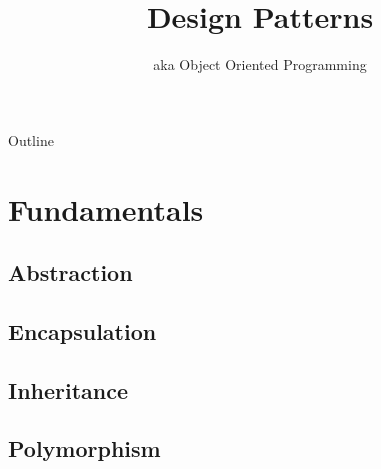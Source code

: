 \documentclass{beamer}
\title{Design Patterns}
\subtitle{aka Object Oriented Programming}
\begin{document}
\begin{frame}
  \titlepage
\end{frame}

\begin{frame}{Outline}
  \tableofcontents
\end{frame}

\section{Fundamentals}

\subsection{Abstraction}

\begin{frame}{}
\end{frame}

\subsection{Encapsulation}

\begin{frame}{}
\end{frame}

\subsection{Inheritance}

\begin{frame}{}
\end{frame}

\subsection{Polymorphism}

\begin{frame}{}
\end{frame}
\end{document}
